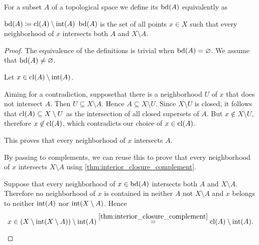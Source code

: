 \begin{definition}\label{def:topological_boundary}
  For a subset \( A \) of a topological space we define its  \( \operatorname{bd}(A) \) equivalently as
  \begin{defenum}
     \( \operatorname{bd}(A) \coloneqq \operatorname{cl}(A) \setminus \operatorname{int}(A) \)
     \( \operatorname{bd}(A) \) is the set of all points \( x \in X \) such that every neighborhood of \( x \) intersects both \( A \) and \( X \setminus A \).
  \end{defenum}
\end{definition}
\begin{proof}
  The equivalence of the definitions is trivial when \( \operatorname{bd}(A) = \varnothing \). We assume that \( \operatorname{bd}(A) \neq \varnothing \).

  \begin{description}
     Let \( x \in \operatorname{cl}(A) \setminus \operatorname{int}(A) \).

    Aiming for a contradiction, suppose\LEM that there is a neighborhood \( U \) of \( x \) that does not intersect \( A \). Then \( U \subseteq X \setminus A \). Hence \( A \subseteq X \setminus U \). Since \( X \setminus U \) is closed, it follows that \( \operatorname{cl}(A) \subseteq X \setminus U \) as the intersection of all closed supersets of \( A \). But \( x \not\in X \setminus U \), therefore \( x \not\in \operatorname{cl}(A) \), which contradicts our choice of \( x \in \operatorname{cl}(A) \).

    This proves that every neighborhood of \( x \) intersects \( A \).

    By passing to complements, we can reuse this to prove that every neighborhood of \( x \) intersects \( X \setminus A \) using \cref{thm:interior_closure_complement}.

     Suppose that every neighborhood of \( x \in \operatorname{bd}(A) \) intersects both \( A \) and \( X \setminus A \). Therefore no neighborhood of \( x \) is contained in neither \( A \) not \( X \setminus A \) and \( x \) belongs to neither \( \operatorname{int}(A) \) nor \( \operatorname{int}(X \setminus A) \). Hence
    \begin{equation*}
      x \in (X \setminus \operatorname{int}(X \setminus A)) \setminus \operatorname{int}(A) \overset {\ref{thm:interior_closure_complement}} = \operatorname{cl}(A) \setminus \operatorname{int}(A).
    \end{equation*}
  \end{description}
\end{proof}

